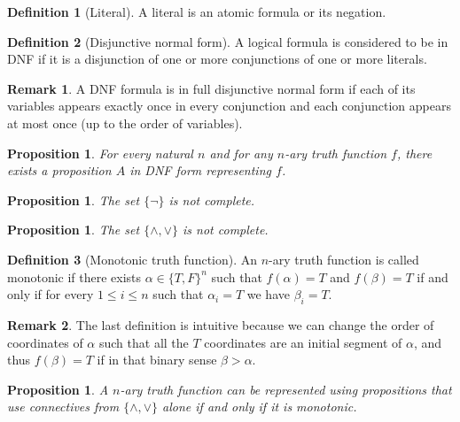 \documentclass[11pt,a4paper]{article}
\theoremstyle{definition}
\newtheorem{definition}{Definition}[section]
\newtheorem{remark}{Remark}[section]
\theoremstyle{plain}
\newtheorem{proposition}[theorem]{Proposition}
\begin{document}
  \begin{definition}[Literal]
    A literal is an atomic formula or its negation.
  \end{definition}

  \begin{definition}[Disjunctive normal form]
    A logical formula is considered to be in DNF if it is a disjunction of 
    one or more conjunctions of one or more literals.
  \end{definition}

  \begin{remark}
    A DNF formula is in full disjunctive normal form if each of its 
    variables appears exactly once in every conjunction and each 
    conjunction appears at most once (up to the order of variables).
  \end{remark}

  \begin{proposition}
    For every natural $n$ and for any $n$-ary truth function $f$,
    there exists a proposition $A$ in DNF form representing $f$.
  \end{proposition}

  \begin{proposition}
    The set $\{\neg\}$ is not complete.
  \end{proposition}

  \begin{proposition}
    The set $\{\land, \lor\}$ is not complete.
  \end{proposition}

  \begin{definition}[Monotonic truth function]
    An $n$-ary truth function is called monotonic if there exists
    $\alpha \in \{T, F\}^n$ such that $f(\alpha) = T$ and $f(\beta) = T$
    if and only if for every $1 \le i \le n$ such that $\alpha_i = T$
    we have $\beta_i = T$.
  \end{definition}

  \begin{remark}
    The last definition is intuitive because we can change the order of
    coordinates of $\alpha$ such that all the $T$ coordinates are an
    initial segment of $\alpha$, and thus $f(\beta) = T$ if in that binary
    sense $\beta > \alpha$.
  \end{remark}

  \begin{proposition}
    A $n$-ary truth function can be represented using propositions that use
    connectives from $\{\land, \lor\}$ alone if and only if it is monotonic.
  \end{proposition}
\end{document}
